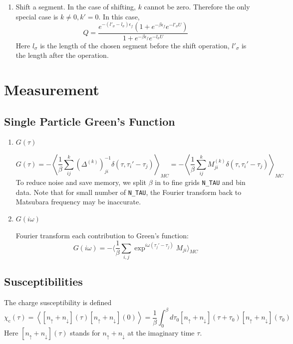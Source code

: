 \begin{enumerate}
  \item Shift a segment.
    In the case of shifting, $k$ cannot be zero. Therefore the only special case
    is $k\neq 0, k'=0$. In this case,
    \begin{equation}
      \label{eq:9}
      Q=\frac{e^{-(l'_\sigma-l_\sigma)\epsilon_f}(1+e^{-\beta\epsilon_f}e^{-l'_\sigma U})}{1+e^{-\beta\epsilon_f}e^{-l_\sigma U}}
    \end{equation}
    Here $l_\sigma$ is the length of the chosen segment before the shift 
    operation, $l'_\sigma$ is the length after the operation.


 \end{enumerate}
 
\section{Measurement}
\label{sec:cthyb_measurement}
\subsection{Single Particle Green's Function}
\begin{enumerate}
\item{$G(\tau)$}


\[
G(\tau)=-\left\langle\frac{1}{\beta}\sum_{ij}^k
\left(\Delta^{(k)}\right)^{-1}_{ji}\delta(\tau,\tau_i'-\tau_j)\right\rangle_{MC}
=-\left\langle\frac{1}{\beta}\sum_{ij}^k
M^{(k)}_{ji}\delta(\tau,\tau_i'-\tau_j)\right\rangle_{MC}
\]
To reduce noise and save memory, we split $\beta$ in to fine grids \verb|N_TAU| 
and bin data. 
Note that for small number of \verb|N_TAU|,
the Fourier transform back to Matsubara frequency may be inaccurate. 

\item{$G(i\omega)$}

Fourier transform each contribution to Green's function:
\[
G(i\omega)=-\langle\frac{1}{\beta}\sum_{i,j}\exp^{i\omega(\tau_j'-\tau_j)}M_{ji}\rangle_{MC}
\]





\end{enumerate}
\subsection{Susceptibilities}

The charge susceptibility is defined 
\begin{equation}
  \label{eq:chi-charge}
  \chi_\mathrm{c}(\tau)=\left\langle[n_\uparrow+n_\downarrow](\tau)  [n_\uparrow+n_\downarrow](0)\right\rangle=\frac{1}{\beta}\int_0^\beta d\tau_0[n_\uparrow+n_\downarrow](\tau+\tau_0)  [n_\uparrow+n_\downarrow](\tau_0)
\end{equation}
Here $[n_\uparrow+n_\downarrow](\tau)$ stands for $n_\uparrow+n_\downarrow$ 
at the imaginary time $\tau$.


